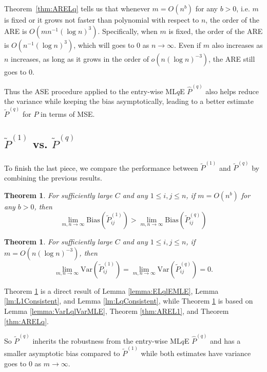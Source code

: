 \documentclass[a4paper]{article}
\newtheorem{theorem}[fact]{Theorem}
\renewcommand{\hat}{\widehat}
\begin{document}
Theorem~\ref{thm:ARELq} tells us that whenever $m = O(n^b)$ for any $b > 0$, i.e. $m$ is fixed or it grows not faster than polynomial with respect to $n$, the order of the ARE is $O(m n^{-1} (\log n)^3)$. Specifically, when $m$ is fixed, the order of the ARE is $O(n^{-1} (\log n)^3)$, which will goes to 0 as $n \to \infty$. Even if $m$ also increases as $n$ increases, as long as it grows in the order of $o(n (\log n)^{-3})$, the ARE still goes to 0. 

Thus the ASE procedure applied to the entry-wise ML$q$E $\hat{P}^{(q)}$ also helps reduce the variance while keeping the bias asymptotically, leading to a better estimate $\widetilde{P}^{(q)}$ for $P$ in terms of MSE.


\subsection{$\widetilde{P}^{(1)}$ vs. $\widetilde{P}^{(q)}$}

To finish the last piece, we compare the performance between $\widetilde{P}^{(1)}$ and $\widetilde{P}^{(q)}$ by combining the previous results.

\begin{theorem}
\label{thm:biasL1andLq}
For sufficiently large $C$ and any $1 \le i,j \le n$, if $m = O(n^b)$ for any $b > 0$, then
\[
	\lim_{m, n \to \infty} \mathrm{Bias}(\widetilde{P}_{ij}^{(1)})
    > \lim_{m, n \to \infty} \mathrm{Bias}(\widetilde{P}_{ij}^{(q)})
\]
\end{theorem}

\begin{theorem}
\label{thm:varianceL1andLq}
For sufficiently large $C$ and any $1 \le i,j \le n$, if $m = O(n (\log n)^{-3})$, then
\[
	\lim_{m, n \to \infty} \mathrm{Var}(\widetilde{P}_{ij}^{(1)})
    = \lim_{m, n \to \infty} \mathrm{Var}(\widetilde{P}_{ij}^{(q)}) = 0.
\]
\end{theorem}

Theorem \ref{thm:biasL1andLq} is a direct result of Lemma \ref{lemma:ELqlEMLE}, Lemma \ref{lm:L1Consistent}, and Lemma \ref{lm:LqConsistent}, while Theorem \ref{thm:varianceL1andLq} is based on Lemma \ref{lemma:VarLqlVarMLE}, Theorem \ref{thm:AREL1}, and Theorem \ref{thm:ARELq}.

So $\widetilde{P}^{(q)}$ inherits the robustness from the entry-wise ML$q$E $\hat{P}^{(q)}$ and has a smaller asymptotic bias compared to $\widetilde{P}^{(1)}$ while both estimates have variance goes to 0 as $m \to \infty$.
\end{document}

